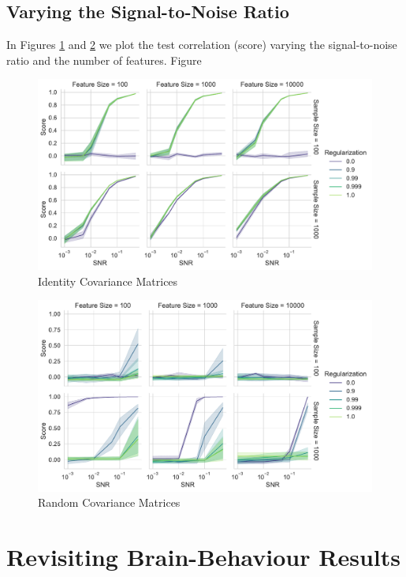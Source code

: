 \subsection{Varying the Signal-to-Noise Ratio}

In Figures \ref{fig:snr-scores-identity} and \ref{fig:snr-scores-random} we plot the test correlation (score) varying the signal-to-noise ratio and the number of features.
Figure 

\begin{figure}
    \centering
    \includegraphics[width=\linewidth]{figures/simulated/snr/snr_vs_scores_facet_identity}
    \caption{Identity Covariance Matrices}\label{fig:snr-scores-identity}
\end{figure}

\begin{figure}
    \centering
    \includegraphics[width=\linewidth]{figures/simulated/snr/snr_vs_scores_facet_random}
    \caption{Random Covariance Matrices}\label{fig:snr-scores-random}
\end{figure}

\section{Revisiting Brain-Behaviour Results}

